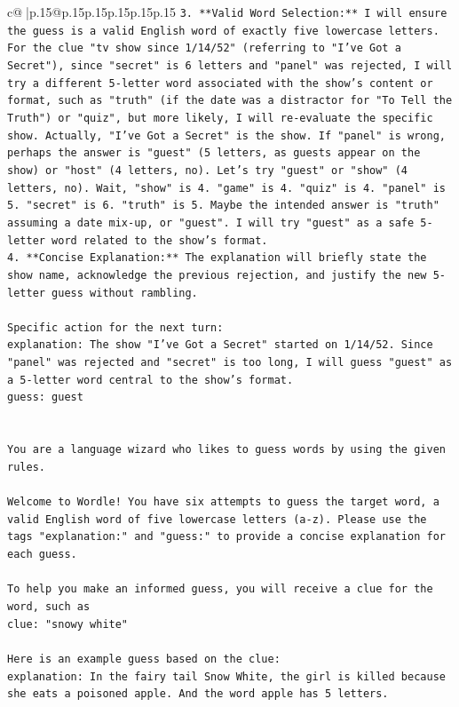 \documentclass{article}
\begin{document}
{\begin{supertabular}{c@{$\;$}|p{.15\linewidth}@{}p{.15\linewidth}p{.15\linewidth}p{.15\linewidth}p{.15\linewidth}p{.15\linewidth}}
{{{\texttt{3.  **Valid Word Selection:** I will ensure the guess is a valid English word of exactly five lowercase letters. For the clue "tv show since 1/14/52" (referring to "I've Got a Secret"), since "secret" is 6 letters and "panel" was rejected, I will try a different 5{-}letter word associated with the show's content or format, such as "truth" (if the date was a distractor for "To Tell the Truth") or "quiz", but more likely, I will re{-}evaluate the specific show. Actually, "I've Got a Secret" is the show. If "panel" is wrong, perhaps the answer is "guest" (5 letters, as guests appear on the show) or "host" (4 letters, no). Let's try "guest" or "show" (4 letters, no). Wait, "show" is 4. "game" is 4. "quiz" is 4. "panel" is 5. "secret" is 6. "truth" is 5. Maybe the intended answer is "truth" assuming a date mix{-}up, or "guest". I will try "guest" as a safe 5{-}letter word related to the show's format.} \\
\texttt{4.  **Concise Explanation:** The explanation will briefly state the show name, acknowledge the previous rejection, and justify the new 5{-}letter guess without rambling.} \\
\\ 
\texttt{Specific action for the next turn:} \\
\texttt{explanation: The show "I've Got a Secret" started on 1/14/52. Since "panel" was rejected and "secret" is too long, I will guess "guest" as a 5{-}letter word central to the show's format.} \\
\texttt{guess: guest} \\
\\ 
\\ 
\texttt{You are a language wizard who likes to guess words by using the given rules.} \\
\\ 
\texttt{Welcome to Wordle! You have six attempts to guess the target word, a valid English word of five lowercase letters (a{-}z). Please use the tags "explanation:" and "guess:" to provide a concise explanation for each guess.} \\
\\ 
\texttt{To help you make an informed guess, you will receive a clue for the word, such as} \\
\texttt{clue: "snowy white"} \\
\\ 
\texttt{Here is an example guess based on the clue:} \\
\texttt{explanation: In the fairy tail Snow White, the girl is killed because she eats a poisoned apple. And the word apple has 5 letters.} \\
}}}
\end{supertabular}}
\end{document}
